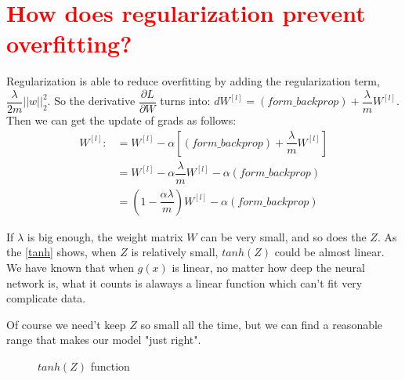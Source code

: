 \documentclass[10pt]{article}
\begin{document}
\section{\protect\textcolor{red}{How does regularization prevent overfitting?}}
\indent Regularization is able to reduce overfitting by adding the regularization term, $\dfrac{\lambda}{2m}||w||_{2}^{2}$. So the derivative $\dfrac{\partial L}{\partial W}$ turns into: $dW^{[l]}=(form\_backprop)+\dfrac{\lambda}{m}W^{[l]}$. Then we can get the update of grads as follows:
\begin{align}
W^{[l]}:&=W^{[l]}-\alpha [ (form\_backprop)+\dfrac{\lambda}{m}W^{[l]}]\\
&=W^{[l]}-\alpha\dfrac{\lambda}{m}W^{[l]}-\alpha(form\_backprop)\\
&=(1-\dfrac{\alpha\lambda}{m})W^{[l]}-\alpha(form\_backprop)
\end{align} 




\indent If $\lambda$ is big enough, the weight matrix $W$ can be very small, and so does the $Z$. As the \autoref{tanh} shows, when $Z$ is relatively small, $tanh(Z)$ could be almost linear. We have known that when $g(x)$ is linear, no matter how deep the neural network is, what it counts is alaways a linear function which can't fit very complicate data.

\indent Of course we need't keep $Z$ so small all the time, but we can find a reasonable range that makes our model "just right".

\par
\begin{figure}[htbp]
\caption{$tanh(Z)$ function}
\label{tanh}%
\end{figure}
\end{document}
